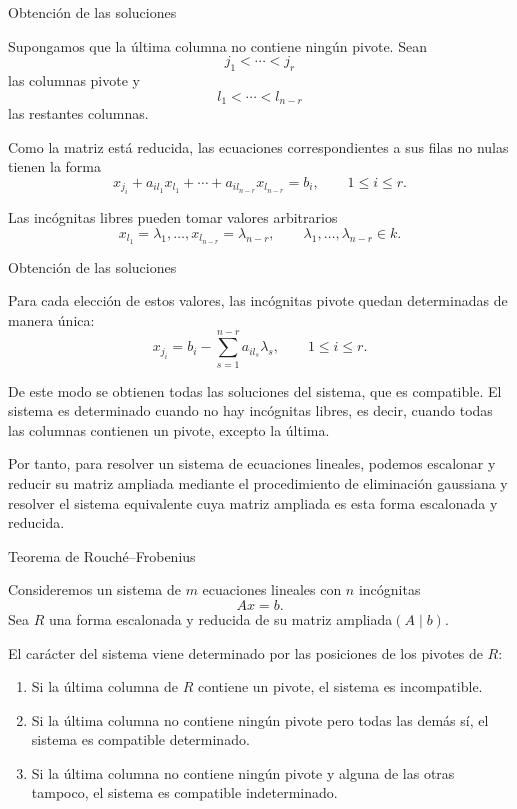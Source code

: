 \begin{frame}{Obtención de las soluciones}

Supongamos que la última columna no contiene ningún pivote. Sean
\[
j_1<\cdots<j_r
\]
las columnas pivote y
\[
l_1<\cdots<l_{n-r}
\]
las restantes columnas.

Como la matriz está reducida, las ecuaciones correspondientes a sus
filas no nulas tienen la forma
\[
x_{j_i}
+a_{i l_1}x_{l_1}+\cdots+a_{i l_{n-r}}x_{l_{n-r}}
=b_i,
\qquad 1\leq i\leq r.
\]

Las incógnitas libres pueden tomar valores arbitrarios
\[
x_{l_1}=\lambda_1,\ldots,x_{l_{n-r}}=\lambda_{n-r},
\qquad
\lambda_1,\ldots,\lambda_{n-r}\in k.
\]

\end{frame}

\begin{frame}[t]{Obtención de las soluciones}

Para cada elección de estos valores, las incógnitas pivote quedan
determinadas de manera única:
\[
x_{j_i}
=
b_i-\sum_{s=1}^{n-r}a_{i l_s}\lambda_s,
\qquad 1\leq i\leq r.
\]

De este modo se obtienen todas las soluciones del sistema, que es \alert{compatible}. El sistema es \alert{determinado} cuando no hay incógnitas libres, es decir, cuando todas las columnas contienen un pivote, excepto la última.

\medskip

Por tanto, para resolver un sistema de ecuaciones lineales, podemos escalonar y reducir su matriz ampliada mediante el procedimiento de eliminación gaussiana y resolver el sistema equivalente cuya matriz ampliada es esta forma escalonada y reducida.

\end{frame}


\begin{frame}{Teorema de Rouché--Frobenius}

\begin{theorem}
Consideremos un sistema de \(m\) ecuaciones lineales con \(n\)
incógnitas
\[
Ax=b.
\]
Sea $R$ una forma escalonada y reducida de su matriz ampliada\((A\mid b).
\)

\medskip

El carácter del sistema viene determinado por las posiciones de los
pivotes de \(R\):
\begin{enumerate}
\item Si la última columna de \(R\) contiene un pivote, el sistema es
\alert{incompatible}.

\item Si la última columna no contiene ningún pivote pero todas las demás sí, el sistema es
\alert{compatible determinado}.

\item Si la última columna no contiene ningún pivote y alguna de las
otras tampoco, el sistema es
\alert{compatible indeterminado}.
\end{enumerate}
\end{theorem}

\end{frame}

